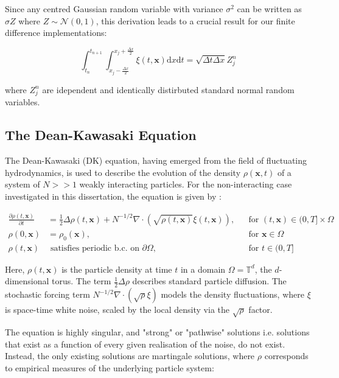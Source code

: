 Since any centred Gaussian random variable with variance $\sigma^2$ can be written as $\sigma Z$ where 
$Z \sim \mathcal{N}(0,1)$, this derivation leads to a crucial 
result for our finite difference implementations:

\begin{equation}\label{eq:white_noise_result}
    \int_{t_n}^{t_{n+1}} \int_{x_j - \frac{\Delta x}{2}}^{x_j + \frac{\Delta x}{2}} \xi(t, \mathbf{x})
    \mathrm{d}x \mathrm{d}t = \sqrt{\Delta t \Delta x} Z_j^n
\end{equation}

where $Z_j^n$ are idependent and identically distirbuted standard normal random variables.

\subsection{The Dean-Kawasaki Equation}

The Dean-Kawasaki (DK) equation, having emerged from the field of fluctuating 
hydrodynamics, is used to describe the evolution of the density 
$\rho(\mathbf{x}, t)$ of a system of $N >> 1$ weakly interacting particles.
For the non-interacting case investigated in this dissertation, the equation is given by
\cite{cornalba2025multilevel}:

\begin{align}\label{eq:dk_spde_2}
\frac{\partial \rho(t, \mathbf{x})}{\partial t} &=
\frac{1}{2}\Delta\rho(t, \mathbf{x}) + N^{-1/2}\nabla\cdot(\sqrt{\rho(t, \mathbf{x})}\xi(t, \mathbf{x})), 
&& \text{for } (t, \mathbf{x}) \in (0, T] \times \Omega \tag{DK} \\
\rho(0, \mathbf{x}) &= \rho_0(\mathbf{x}), && \text{for } \mathbf{x} \in \Omega \nonumber \\
\rho(t, \mathbf{x}) &\text{ satisfies periodic b.c. on } \partial \Omega, && \text{for } t \in (0, T] \nonumber
\end{align}

Here, $\rho(t, \mathbf{x})$ is the particle density at time $t$ in a 
domain $\Omega = \mathbb{T}^d$, the $d$-dimensional torus. 
The term $\frac{1}{2} \Delta \rho$ describes
standard particle diffusion. The stochastic forcing term $N^{-1/2}
\nabla \cdot (\sqrt{\rho}\xi)$ models the density fluctuations,
where $\xi$ is space-time white noise, scaled by the local density 
via the $\sqrt{\rho}$ factor.


The equation is highly singular, and "strong" or "pathwise" solutions 
i.e. solutions that exist as a function of every given realisation 
of the noise, do not exist. Instead, the only existing solutions are martingale 
solutions, where $\rho$ corresponds to empirical measures of the underlying 
particle system:

